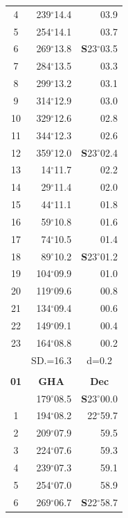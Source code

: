 \documentclass[10pt, a4paper]{report}
\begin{document}
\begin{scriptsize}
\begin{tabular*}{0.2\textwidth}[t]{@{\extracolsep{\fill}}|c|rr|}
4 & 239$^\circ$14.4 & 03.9\\
5 & 254$^\circ$14.1 & 03.7\\[2Pt]
6 & 269$^\circ$13.8 & \textbf{S}23$^\circ$03.5\\
7 & 284$^\circ$13.5 & 03.3\\
8 & 299$^\circ$13.2 & 03.1\\
9 & 314$^\circ$12.9 & \raisebox{0.24ex}{\boldmath$\cdot$~\boldmath$\cdot$~~}03.0\\
10 & 329$^\circ$12.6 & 02.8\\
11 & 344$^\circ$12.3 & 02.6\\[2Pt]
12 & 359$^\circ$12.0 & \textbf{S}23$^\circ$02.4\\
13 & 14$^\circ$11.7 & 02.2\\
14 & 29$^\circ$11.4 & 02.0\\
15 & 44$^\circ$11.1 & \raisebox{0.24ex}{\boldmath$\cdot$~\boldmath$\cdot$~~}01.8\\
16 & 59$^\circ$10.8 & 01.6\\
17 & 74$^\circ$10.5 & 01.4\\[2Pt]
18 & 89$^\circ$10.2 & \textbf{S}23$^\circ$01.2\\
19 & 104$^\circ$09.9 & 01.0\\
20 & 119$^\circ$09.6 & 00.8\\
21 & 134$^\circ$09.4 & \raisebox{0.24ex}{\boldmath$\cdot$~\boldmath$\cdot$~~}00.6\\
22 & 149$^\circ$09.1 & 00.4\\
23 & 164$^\circ$08.8 & 00.2\\
\hline
\rule{0pt}{2.4ex} & \multicolumn{1}{c}{SD.=16.3} & \multicolumn{1}{c|}{d=0.2}\\
\hline
\multicolumn{1}{c}{}\\[-0.5ex]\hline
\multicolumn{1}{|c|}{\rule{0pt}{2.6ex}\textbf{01}} & \multicolumn{1}{c}{\textbf{GHA}} & \multicolumn{1}{c|}{\textbf{Dec}}\\
\hline\rule{0pt}{2.6ex}\noindent
0 & 179$^\circ$08.5 & \textbf{S}23$^\circ$00.0\\
1 & 194$^\circ$08.2 & 22$^\circ$59.7\\
2 & 209$^\circ$07.9 & 59.5\\
3 & 224$^\circ$07.6 & \raisebox{0.24ex}{\boldmath$\cdot$~\boldmath$\cdot$~~}59.3\\
4 & 239$^\circ$07.3 & 59.1\\
5 & 254$^\circ$07.0 & 58.9\\[2Pt]
6 & 269$^\circ$06.7 & \textbf{S}22$^\circ$58.7\\

\end{tabular*}
\end{scriptsize}
\end{document}
